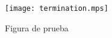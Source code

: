 \documentclass[a4paper]{article}
\begin{document}
\begin{figure}[thbp]
	\begin{center}
		\texttt{[image: termination.mps]}
	\end{center}
	\caption{Figura de prueba}
\end{figure}
\end{document}
